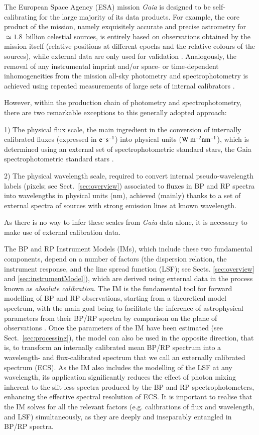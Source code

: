 \documentclass{aa}
\newcommand{\gaia}{\textit{Gaia}\xspace}
\newcommand{\xp}{BP and RP\xspace}
\newcommand{\secname}{Sect.}
\newcommand{\secref}[1]{\secname~\ref{sec:#1}}
\begin{document}
The European Space Agency (ESA) mission \gaia \citep{Prusti2016} is designed to be self-calibrating for the large majority of its data products. For example, the core product of the mission, namely exquisitely accurate and precise astrometry for $\simeq 1.8$~billion celestial sources, is entirely based on observations obtained by the mission itself (relative positions at different epochs and the relative colours of the sources), while external data are only used for validation \citep{LL:LL-EDR3}. Analogously, the removal of any instrumental imprint and/or space- or time-dependent inhomogeneities from the mission all-sky photometry and spectrophotometry is achieved using repeated measurements of large sets of internal calibrators \citep{Riello2021, Carrasco2021, DeAngeli2022}.

However, within the production chain of photometry and spectrophotometry, there are two remarkable exceptions to this generally adopted approach:

    1) The physical flux scale, the main ingredient in the conversion of internally calibrated fluxes (expressed in $\rm e^-s^{-1}$) into physical units ($\rm W~m^{-2}nm^{-1}$), which is determined using an external set of spectrophotometric standard stars, the Gaia spectrophotometric standard stars \citep[SPSSs;][]{Pancino2021}. 
    
    2) The physical wavelength scale, required to convert internal pseudo-wavelength labels (pixels; see \secref{overview}) associated to fluxes in \xp spectra into wavelengths in physical units (nm), achieved (mainly) thanks to a set of external spectra of sources with strong emission lines at known wavelength.

As there is no way to infer these scales from \gaia data alone, it is necessary to make use of external calibration data.

The \xp Instrument Models (IMs), which include these two fundamental components, depend on a number of factors (the dispersion relation, the instrument response, and the line spread function (LSF); see Sects. \ref{sec:overview} and \ref{sec:instrumentModel}), which 
are derived using external data in the process known as \textit{absolute calibration}. The IM is the fundamental tool for forward modelling of \xp observations, starting from a theoretical model spectrum, with the main goal being to facilitate the inference of astrophysical parameters from their BP/RP spectra by comparison on the plane of observations \citep{Creevey2022}.
Once the parameters of the IM have been estimated (see \secref{processing}), the model can also be used in the opposite direction, that is, to transform an internally calibrated mean BP/RP spectrum \citep{DeAngeli2022} into a wavelength- and flux-calibrated spectrum that we call an externally calibrated spectrum (ECS). As the IM also includes the modelling of the LSF at any wavelength, its application significantly reduces the effect of photon mixing inherent to the slit-less spectra produced by the \xp spectrophotometers, enhancing the effective spectral resolution of ECS. It is important to realise that the IM solves for all the relevant factors (e.g. calibrations of flux and wavelength, and LSF) simultaneously, as they are deeply and inseparably entangled in BP/RP spectra. 
\end{document}
